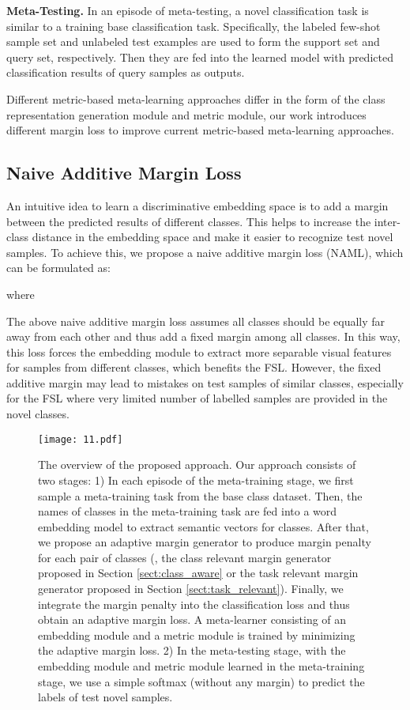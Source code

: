 \documentclass[10pt,twocolumn,letterpaper]{article}
\begin{document}
\noindent\textbf{Meta-Testing.}  In an episode of meta-testing, a novel classification task is similar to a training base classification task. Specifically, the labeled few-shot sample set and unlabeled test examples are used to form the support set and query set, respectively. Then they are fed into the learned model with predicted classification results of query samples as outputs.

Different metric-based meta-learning  approaches differ in the form of the class representation generation module and metric module, our work introduces different margin loss to improve current metric-based meta-learning approaches.

\subsection{Naive Additive Margin Loss}
\label{sect:simple_additive}


An intuitive idea to learn a discriminative embedding space is to add a  margin between the predicted results of different classes. This helps to increase the inter-class distance in the embedding space and make it easier to recognize test novel samples.
To achieve this, we propose a naive additive margin loss (NAML), which can be formulated as:

where 


The above naive additive margin loss assumes all classes should be equally far away from each other and thus add a fixed margin among all classes. In this way, this loss forces the embedding module  to extract more separable visual features for samples from different classes, which benefits the FSL. However, the fixed additive margin may lead to mistakes on test samples of similar classes, especially for the FSL where very limited number of labelled samples are provided in the novel classes.

\begin{figure*}[t]
\begin{center}
\texttt{[image: 11.pdf]}
\end{center} \caption{The overview of the proposed approach. Our approach consists of two stages: 1) In each episode of the meta-training stage,  we first sample a meta-training task from the base class dataset. Then, the names of classes in the meta-training task are fed into a word embedding model to extract semantic vectors for classes. After that, we propose an adaptive margin generator to produce margin penalty for each pair of classes (\eg, the class relevant margin generator proposed in Section \ref{sect:class_aware} or the task relevant margin generator proposed in Section \ref{sect:task_relevant}). Finally, we integrate the margin penalty into the classification loss and thus obtain an adaptive margin loss. A meta-learner consisting of an embedding module and a metric module is trained by minimizing the adaptive margin loss. 2) In the meta-testing stage, with the embedding module and metric module learned in the meta-training stage, we use a simple softmax (without any margin) to predict the labels of test novel samples. }
\label{overview}
\end{figure*}
\end{document}

